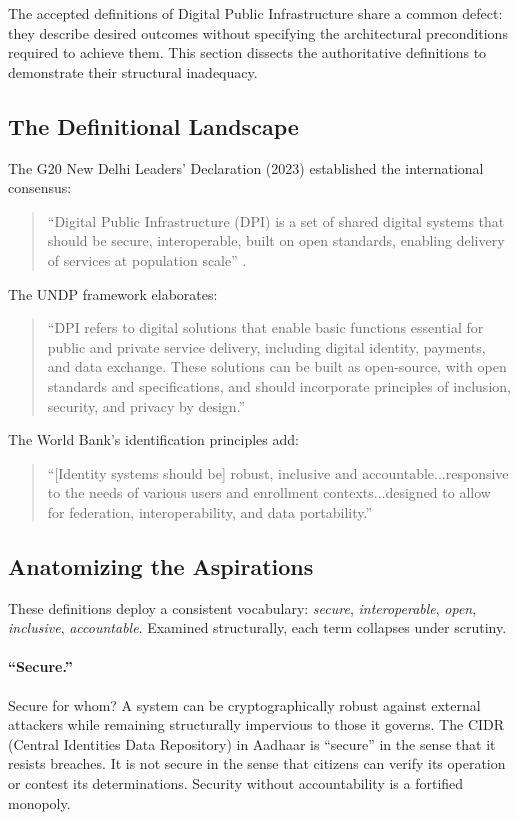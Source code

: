 The accepted definitions of Digital Public Infrastructure share a common defect: they describe desired outcomes without specifying the architectural preconditions required to achieve them. This section dissects the authoritative definitions to demonstrate their structural inadequacy.

\subsection{The Definitional Landscape}

The G20 New Delhi Leaders' Declaration (2023) established the international consensus:

\begin{quote}
``Digital Public Infrastructure (DPI) is a set of shared digital systems that should be secure, interoperable, built on open standards, enabling delivery of services at population scale'' \citep{g20}.
\end{quote}

The UNDP framework \citep{undp} elaborates:

\begin{quote}
``DPI refers to digital solutions that enable basic functions essential for public and private service delivery, including digital identity, payments, and data exchange. These solutions can be built as open-source, with open standards and specifications, and should incorporate principles of inclusion, security, and privacy by design.''
\end{quote}

The World Bank's identification principles add:

\begin{quote}
``[Identity systems should be] robust, inclusive and accountable...responsive to the needs of various users and enrollment contexts...designed to allow for federation, interoperability, and data portability.''
\end{quote}

\subsection{Anatomizing the Aspirations}

These definitions deploy a consistent vocabulary: \textit{secure}, \textit{interoperable}, \textit{open}, \textit{inclusive}, \textit{accountable}. Examined structurally, each term collapses under scrutiny.

\paragraph{``Secure.''}  Secure for whom? A system can be cryptographically robust against external attackers while remaining structurally impervious to those it governs. The CIDR (Central Identities Data Repository) in Aadhaar is ``secure'' in the sense that it resists breaches. It is not secure in the sense that citizens can verify its operation or contest its determinations. Security without accountability is a fortified monopoly.

